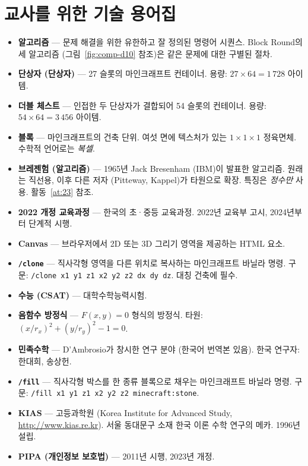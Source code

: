 \documentclass[12pt,a4paper]{scrartcl}
\newcommand{\code}[1]{\texttt{\small #1}}
\newcommand{\acc}[1]{\textcolor{accent}{\textbf{#1}}}
\newcommand{\cmd}[1]{\textcolor{earth}{\texttt{\small #1}}}
\begin{document}
\newpage
\section{교사를 위한 기술 용어집}\label{ap:glos}

\begin{itemize}[leftmargin=1.4em,itemsep=0.3em,topsep=0.3em]
  \item \acc{알고리즘} --- 문제 해결을 위한 유한하고 잘 정의된 명령어 시퀀스. Block Round의 세 알고리즘 (그림~\ref{fig:comp-d10} 참조)은 같은 문제에 대한 구별된 절차.
  \item \acc{단상자 (단상자)} --- 27 슬롯의 마인크래프트 컨테이너. 용량: $27 \times 64 = 1\,728$ 아이템.
  \item \acc{더블 체스트} --- 인접한 두 단상자가 결합되어 54 슬롯의 컨테이너. 용량: $54 \times 64 = 3\,456$ 아이템.
  \item \acc{블록} --- 마인크래프트의 건축 단위. 여섯 면에 텍스처가 있는 $1\times1\times1$ 정육면체. 수학적 언어로는 \emph{복셀}.
  \item \acc{브레젠험 (알고리즘)} --- 1965년 Jack Bresenham (IBM)이 발표한 알고리즘. 원래는 직선용, 이후 다른 저자 (Pitteway, Kappel)가 타원으로 확장. 특징은 \emph{정수만} 사용. 활동~\ref{at:23} 참조.
  \item \acc{2022 개정 교육과정} --- 한국의 초·중등 교육과정. 2022년 교육부 고시, 2024년부터 단계적 시행.
  \item \acc{Canvas} --- 브라우저에서 2D 또는 3D 그리기 영역을 제공하는 HTML 요소.
  \item \acc{\code{/clone}} --- 직사각형 영역을 다른 위치로 복사하는 마인크래프트 바닐라 명령. 구문: \cmd{/clone x1 y1 z1 x2 y2 z2 dx dy dz}. 대칭 건축에 필수.
  \item \acc{수능 (CSAT)} --- 대학수학능력시험.
  \item \acc{음함수 방정식} --- $F(x, y) = 0$ 형식의 방정식. 타원: $(x/r_x)^2 + (y/r_y)^2 - 1 = 0$.
  \item \acc{민족수학} --- D'Ambrosio가 창시한 연구 분야 (한국어 번역본 있음). 한국 연구자: 한대희, 송상헌.
  \item \acc{\code{/fill}} --- 직사각형 박스를 한 종류 블록으로 채우는 마인크래프트 바닐라 명령. 구문: \cmd{/fill x1 y1 z1 x2 y2 z2 minecraft:stone}.
  \item \acc{KIAS} --- 고등과학원 (Korea Institute for Advanced Study, \url{http://www.kias.re.kr}). 서울 동대문구 소재 한국 이론 수학 연구의 메카. 1996년 설립.
  \item \acc{PIPA (개인정보 보호법)} --- 2011년 시행, 2023년 개정.

\end{itemize}
\end{document}
